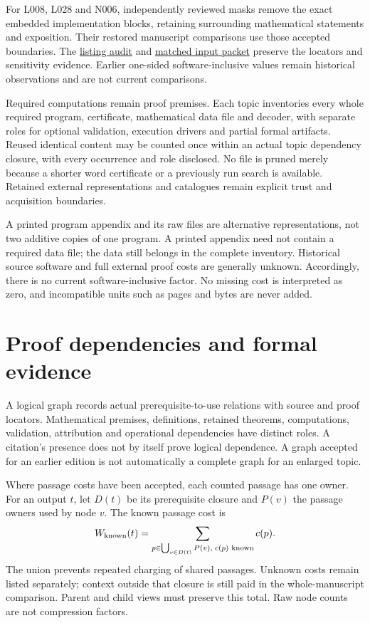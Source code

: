 \documentclass[11pt,a4paper]{article}
\begin{document}
For L008, L028 and N006, independently reviewed masks remove the exact embedded
implementation blocks, retaining surrounding mathematical statements and
exposition. Their restored manuscript comparisons use those accepted boundaries.
The \href{overview/v11/listing\_audit/README.rst}{listing audit} and
\href{overview/v12/matched\_inputs/README.rst}{matched input packet} preserve the
locators and sensitivity evidence. Earlier one-sided software-inclusive values
remain historical observations and are not current comparisons.

Required computations remain proof premises. Each topic inventories every
whole required program, certificate, mathematical data file and decoder, with
separate roles for optional validation, execution drivers and partial formal
artifacts. Reused identical content may be counted once within an actual topic
dependency closure, with every occurrence and role disclosed. No file is pruned
merely because a shorter word certificate or a previously run search is available.
Retained external representations and catalogues remain explicit trust and
acquisition boundaries.

A printed program appendix and its raw files are alternative representations,
not two additive copies of one program. A printed appendix need not contain a
required data file; the data still belongs in the complete inventory. Historical
source software and full external proof costs are generally unknown. Accordingly,
there is no current software-inclusive factor. No missing cost is interpreted
as zero, and incompatible units such as pages and bytes are never added.

\section{Proof dependencies and formal evidence}

A logical graph records actual prerequisite-to-use relations with source and
proof locators. Mathematical premises, definitions, retained theorems,
computations, validation, attribution and operational dependencies have distinct
roles. A citation's presence does not by itself prove logical dependence.
A graph accepted for an earlier edition is not automatically a complete graph
for an enlarged topic.

Where passage costs have been accepted, each counted passage has one owner.
For an output $t$, let $D(t)$ be its prerequisite closure and $P(v)$ the passage
owners used by node $v$. The known passage cost is
\[
 W_{\rm known}(t)=
 \sum_{p\in\bigcup_{v\in D(t)}P(v),\;c(p)\text{ known}}c(p).
\]
The union prevents repeated charging of shared passages. Unknown costs remain
listed separately; context outside that closure is still paid in the
whole-manuscript comparison. Parent and child views must preserve this total.
Raw node counts are not compression factors.
\end{document}
